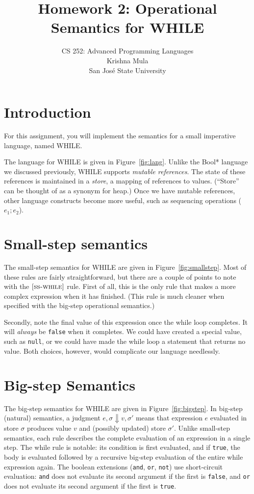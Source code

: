 \documentclass{article}
\title{Homework 2: Operational Semantics for WHILE}
\author{
  CS 252: Advanced Programming Languages \\
  Krishna Mula\\
  San Jos\'{e} State University \\
  }
\date{}
\newcommand{\true}{\mbox{\tt true}}
\newcommand{\false}{\mbox{\tt false}}
\newcommand{\rel}[1]{ \mbox{\sc [#1]} }
\newcommand{\bstep}[4]{{#1},{#2} \Downarrow {#3},{#4}}
\begin{document}
\maketitle

\section{Introduction}

For this assignment,
you will implement the semantics for a small imperative language, named WHILE.

The language for WHILE is given in Figure~\ref{fig:lang}.
Unlike the Bool* language we discussed previously,
WHILE supports \emph{mutable references}.
The state of these references is maintained in a \emph{store},
a mapping of references to values.
(``Store'' can be thought of as a synonym for heap.)
Once we have mutable references, other language constructs become more useful,
such as sequencing operations ($e_1;e_2$).


\section{Small-step semantics}

The small-step semantics for WHILE are given in Figure~\ref{fig:smallstep}.
Most of these rules are fairly straightforward, but there are a couple of points
to note with the $\rel{ss-while}$ rule.
First of all, this is the only rule that makes a more complex expression
when it has finished.
(This rule is much cleaner when specified with the big-step operational semantics.)

Secondly, note the final value of this expression once the while loop completes.
It will \emph{always} be {\false} when it completes.
We could have created a special value, such as {\tt null},
or we could have made the while loop a statement that returns no value.
Both choices, however, would complicate our language needlessly.


\section{Big-step Semantics}

The big-step semantics for WHILE are given in Figure~\ref{fig:bigstep}.
In big-step (natural) semantics, a judgment $\bstep{e}{\sigma}{v}{\sigma'}$
means that expression $e$ evaluated in store $\sigma$ produces value $v$
and (possibly updated) store $\sigma'$.
Unlike small-step semantics, each rule describes the complete evaluation
of an expression in a single step.
The while rule is notable: its condition is first evaluated, and if
\true, the body is evaluated followed by a recursive big-step evaluation
of the entire while expression again.
The boolean extensions (\texttt{and}, \texttt{or}, \texttt{not}) use
short-circuit evaluation: \texttt{and} does not evaluate its second
argument if the first is \false, and \texttt{or} does not evaluate its
second argument if the first is \true.
\end{document}
